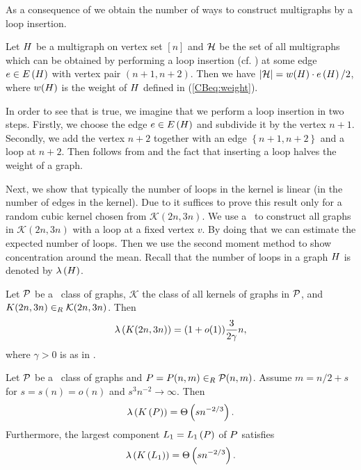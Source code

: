 As a consequence of  we obtain the number of ways to construct multigraphs by a loop insertion. 
\begin{remark}\label{CBprop:loop_insertion}
	Let $H$ be a multigraph on vertex set $[n]$ and $\mathcal{H}$ be the set of all multigraphs which can be obtained by performing a loop insertion (cf. ) at some edge $e\in E\left(H\right)$ with vertex pair $(n+1,n+2)$. Then we have $\left|\mathcal{H}\right|=w(H)\cdot e\left({H}\right)/2$, where $w(H)$ is the weight of $H$ defined in (\ref{CBeq:weight}).
\end{remark}
In order to see that  is true, we imagine that we perform a loop insertion in two steps. Firstly, we choose the edge $e\in E\left(H\right)$ and subdivide it by the vertex $n+1$. Secondly, we add the vertex $n+2$ together with an edge $\left\{n+1, n+2\right\}$ and a loop at $n+2$. Then  follows from  and the fact that inserting a loop halves the weight of a graph.

Next, we show that typically the number of loops in the kernel is linear (in the number of edges in the kernel). Due to  it suffices to prove this result only for a random cubic kernel chosen from $\mathcal{K}(2n,3n)$. We use a \loopInsertion\ to construct all graphs in $\mathcal{K}(2n,3n)$ with a loop at a fixed vertex $v$. By doing that we can estimate the expected number of loops. Then we use the second moment method to show concentration around the mean. Recall that the number of loops in a graph $H$ is denoted by $\lambda\left(H\right)$.

\begin{lem}\label{CBthm:linear_loop}
	Let $\mathcal{P}$ be a \pl\ class of graphs, $\mathcal{K}$ the class of all kernels of graphs in $\mathcal{P}$, and $K(2n,3n)\in_R \mathcal{K}(2n,3n)$. Then \whp
	\begin{align*}
	\lambda\left(K(2n,3n)\right)=(1+o(1)) \frac{3}{2\gamma}n,
	\end{align*}
	where $\gamma>0$ is as in .
\end{lem}

\begin{coro}\label{CBcor:linear_loop}
	Let $\mathcal{P}$ be a \pl\ class of graphs and $P=P(n,m) \in_R \mathcal {P}(n,m)$.
	Assume $m=n/2+s$ for $s=s(n)=o(n)$ and $s^3n^{-2} \to \infty$. Then \whp
	\begin{align*}
	\lambda\left(K\left(P\right)\right)=\Theta\left(sn^{-2/3}\right).
	\end{align*}
	Furthermore, the largest component $L_1=L_1\left(P\right)$ of $P$ satisfies \whp
	\begin{align*}
	\lambda\left(K\left(L_1\right)\right)=\Theta\left(sn^{-2/3}\right).
	\end{align*}
\end{coro}

